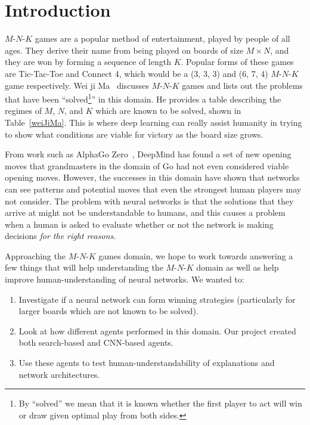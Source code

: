 \section{Introduction}



$M$-$N$-$K$ games are a popular method of entertainment, played by people of all ages.
They derive their name from being played on boards of size $M \times N$, and they are won by forming a sequence of length $K$.
Popular forms of these games are Tic-Tac-Toe and Connect 4, which would be a (3, 3, 3) and (6, 7, 4) $M$-$N$-$K$ game respectively.
Wei ji Ma~\cite{weiJiMa} discusses $M$-$N$-$K$ games and lists out the problems that have been ``solved\footnote{By ``solved'' we mean that it is known whether the first player to act will win or draw given optimal play from both sides.}'' in this domain.
He provides a table describing the regimes of $M$, $N$, and $K$ which are known to be solved, shown in Table~\ref{weiJiMa}.
This is where deep learning can really assist humanity in trying to show what conditions are viable for victory as the board size grows.



From work such as AlphaGo Zero~\cite{alphaGoZero}, DeepMind has found a set of new opening moves that grandmasters in the domain of Go had not even considered viable opening moves.
However, the successes in this domain have shown that networks can see patterns and potential moves that even the strongest human players may not consider.
The problem with neural networks is that the solutions that they arrive at might not be understandable to humans, and this causes a problem when a human is asked to evaluate whether or not the network is making decisions \emph{for the right reasons}.

Approaching the $M$-$N$-$K$ games domain, we hope to work towards answering a few things that will help understanding the $M$-$N$-$K$ domain as well as help improve human-understanding of neural networks.
We wanted to:
\begin{enumerate}\itemsep0em
\item Investigate if a neural network can form winning strategies (particularly for larger boards which are not known to be solved).
\item Look at how different agents performed in this domain.
Our project created both search-based and CNN-based agents.
\item Use these agents to test human-understandability of explanations and network architectures.
\end{enumerate}
